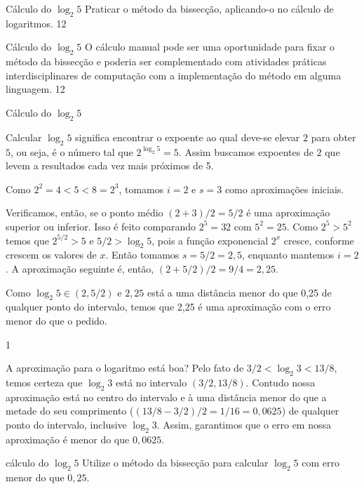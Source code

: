 \clearpage
\begin{objectives}{Cálculo do $\log_2 5$}
{
	Praticar o método da bissecção, aplicando-o no cálculo de logaritmos.
}{1}{2}
\end{objectives}
\begin{sugestions}{Cálculo do $\log_2 5$}
{
	O cálculo manual pode ser uma oportunidade para fixar o método da bissecção e poderia ser complementado com atividades práticas interdisciplinares de computação com a implementação do método em alguma linguagem.
}{1}{2}
\end{sugestions}
\begin{answer}{Cálculo do $\log_2 5$}
{
	Calcular $\log_2 5$ significa encontrar o expoente ao qual deve-se elevar $2$ para obter $5$, ou seja, é o número tal que $2^{\log_2 5} = 5$. Assim buscamos expoentes de $2$ que levem a resultados cada vez mais próximos de 5.

Como $2^2 = 4 <5<8 =2^3$, tomamos $i=2$ e $s=3$ como aproximações iniciais.

	Verificamos, então, se o ponto médio $(2+3)/2=5/2$ é uma aproximação superior ou inferior. Isso é feito comparando $2^5=32$ com $5^2=25$. Como $2^5 > 5^2$ temos que $2^{5/2} > 5$ e $5/2 > \log_2 5$, pois a função exponencial $2^x$ cresce, conforme crescem os valores de $x$. Então tomamos $s=5/2=2,5$, enquanto mantemos $i=2$. A aproximação seguinte é, então, $(2+5/2)/2 = 9/4 = 2,25$.

	Como $\log_2 5 \in (2, 5/2)$ e $2,25$ está a uma distância menor do que 0,25 de qualquer ponto do intervalo, temos que 2,25 é uma aproximação com o erro menor do que o pedido.
}{1}
\end{answer}

A aproximação para o logaritmo está boa? Pelo fato de $3/2 < \log_2 3 < 13/8$, temos certeza que $\log_2 3$ está no intervalo $(3/2,13/8)$. Contudo nossa aproximação está no centro do intervalo e à uma distância menor do que a metade do seu comprimento ($(13/8-3/2)/2= 1/16 = 0,0625$) de qualquer ponto do intervalo, inclusive $\log_2 3$. Assim, garantimos que o erro em nossa aproximação é menor do que $0{,}0625$.

\begin{task}{cálculo do $\log_2 5$}
Utilize o método da bissecção para calcular $\log_2 5$ com erro menor do que $0,25$. 
\end{task}

